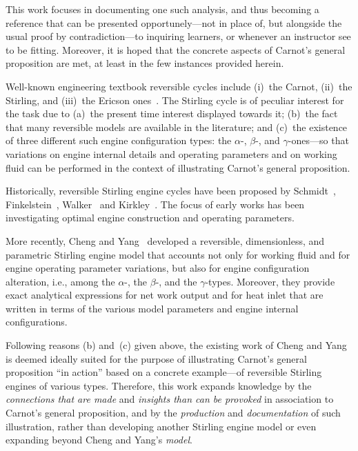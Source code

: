     This work focuses in documenting one such analysis, and thus becoming a reference  that  can
    be  presented  opportunely---not  in  place  of,  but   alongside   the   usual   proof   by
    contradiction---to inquiring  learners,  or  whenever  an  instructor  see  to  be  fitting.
    Moreover, it is hoped that the concrete aspects of Carnot's general proposition are met,  at
    least in the few instances provided herein.

    Well-known engineering textbook reversible cycles include (i)~the Carnot, (ii)~the Stirling,
    and (iii)~the Ericson  ones~\cite{2013-CengelYA+BolesMA-AMGH}.  The  Stirling  cycle  is  of
    peculiar interest for the task due to (a)~the present time interest  displayed  towards  it;
    (b)~the fact that many reversible models  are  available  in  the  literature;  and  (c)~the
    existence of three different such engine configuration types: the $\alpha$-,  $\beta$-,  and
    $\gamma$-ones---so that variations on engine internal details and operating  parameters  and
    on working  fluid  can  be  performed  in  the  context  of  illustrating  Carnot's  general
    proposition.

    Historically,   reversible    Stirling    engine    cycles    have    been    proposed    by
    Schmidt~\cite{1871-SchmidtG-ZeitVerDeutschIng},
    Finkelstein~\cite{1960-FinkelsteinT-SAEIntl},   Walker~\cite{1962-WalkerG-JMechEngSci}   and
    Kirkley~\cite{1962-KirkleyDW-JMechEngSci}. The focus of early works has  been  investigating
    optimal engine construction and operating parameters.

    More recently, Cheng and Yang~\cite{2012-ChengCH+YangHS-ApEnergy}  developed  a  reversible,
    dimensionless, and parametric Stirling engine model that accounts not only for working fluid
    and for engine operating parameter variations, but also for engine configuration alteration,
    i.e., among the $\alpha$-, the $\beta$-, and  the  $\gamma$-types.  Moreover,  they  provide
    exact analytical expressions for net work output and for heat  inlet  that  are  written  in
    terms of the various model parameters and engine internal configurations.

    Following  reasons  (b)  and~(c)   given   above,   the   existing   work   of   Cheng   and
    Yang~\cite{2012-ChengCH+YangHS-ApEnergy}  is  deemed  ideally  suited  for  the  purpose  of
    illustrating Carnot's general proposition ``in action'' based  on  a  concrete  example---of
    reversible Stirling engines of various types. Therefore, this work expands knowledge by  the
    \emph{connections that are made} and \emph{insights than can be provoked} in association  to
    Carnot's general proposition, and by the \emph{production} and \emph{documentation} of  such
    illustration, rather than developing another Stirling engine model or even expanding  beyond
    Cheng and Yang's \emph{model}.


